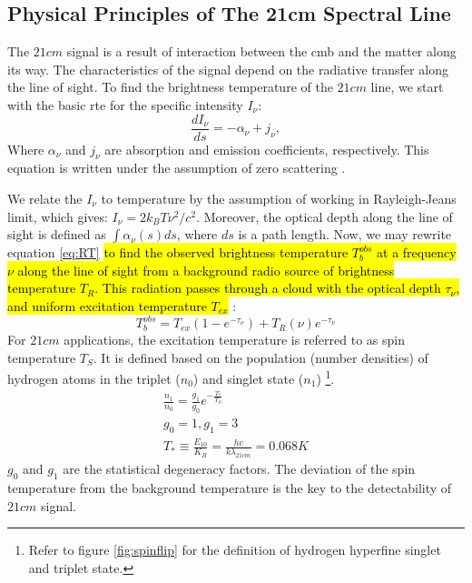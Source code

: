 \documentclass[12pt, TexShade, letterpaper]{report}
\begin{document}
\subsection{Physical Principles of The 21cm Spectral Line}
The $21cm$ signal is a result of interaction between the \gls{cmb} and the matter along its way. The characteristics of the signal depend on the radiative transfer along the line of sight. To find the brightness temperature of the $21cm$ line, we start with the basic \gls{rte} for the specific intensity $I_{\nu}$:
\begin{equation}
    \frac{dI_\nu}{ds} = - \alpha_\nu + j_\nu ,
    \label{eq:RT}
\end{equation}
Where $\alpha_\nu$ and $j_\nu$ are absorption and emission coefficients, respectively. This equation is written under the assumption of zero scattering \cite{21century, low_frequency}. \par
We relate the $I_\nu$ to temperature by the assumption of working in Rayleigh-Jeans limit, which gives: $I_\nu = 2k_B T \nu^2 /c^2$. Moreover, the optical depth along the line of sight is defined as $\int \alpha_\nu \left(s\right) ds$, where $ds$ is a path length. Now, we may rewrite equation \ref{eq:RT} \hl{to find the observed brightness temperature $T^{obs}_b$ at a frequency $\nu$ along the line of sight from a background radio source of brightness temperature $T_R$. This radiation passes through a cloud with the optical depth $\tau_\nu$, and uniform excitation temperature $T_{ex}$} \cite{21century, low_frequency}:
\begin{equation}
    T^{obs}_b = T_{ex} \left(1-e^{-\tau_\nu} \right) + T_R \left (\nu \right) e ^{-\tau_\nu}
\end{equation}
For $21cm$ applications, the excitation temperature is referred to as spin temperature $T_S$. It is defined based on the population (number densities) of hydrogen atoms in the triplet ($n_0$) and singlet state ($n_1$) \cite{21century, low_frequency} \footnote{Refer to figure \ref{fig:spinflip} for the definition of hydrogen hyperfine singlet and triplet state.}.
\begin{gather}
    \frac{n_1}{n_0} = \frac{g_1}{g_0} e ^ {-\frac{T_*}{T_S}}\\
    g_0 =1, g_1 =3\\
     T_* \equiv \frac{E_{10}}{K_B} = \frac {hc}{k\lambda_{21cm}} = 0.068 K
\end{gather}
$g_0$ and $g_1$ are the statistical degeneracy factors. The deviation of the spin temperature from the background temperature is the key to the detectability of $21cm$ signal.\par
\end{document}
